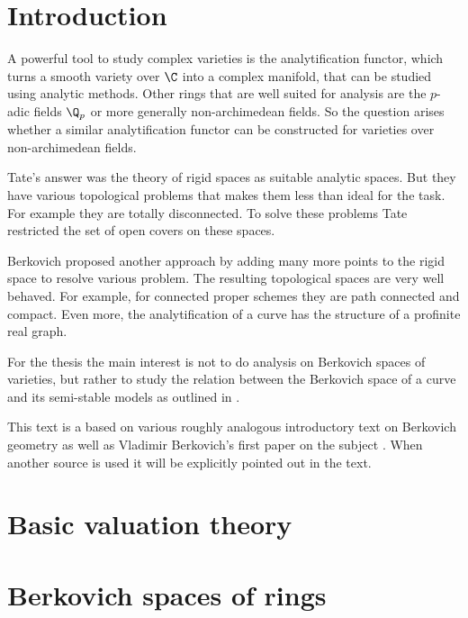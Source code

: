 \section{Introduction} \label{sec:introduction}

A powerful tool to study complex varieties is the analytification functor, which turns a  smooth variety over $\C$ into a complex manifold, that can be studied using analytic methods. 
Other rings that are well suited for analysis are the $p$-adic fields $\Q_p$ or more generally non-archimedean fields. 
So the question arises whether a similar analytification functor can be constructed for  varieties over non-archimedean fields. 

Tate's answer was the theory of rigid spaces as suitable analytic spaces. 
But they have various topological problems that makes them less than ideal for the task. 
For example they are totally disconnected. To solve these problems Tate restricted the set of open covers on these spaces. 

Berkovich proposed another approach by adding many more points to the rigid space to resolve various problem. 
The resulting topological spaces are very well behaved. 
For example, for connected proper schemes they are path connected and compact. 
Even more, the analytification of a curve has the structure of a profinite real graph. 

For the thesis the main interest is not to do analysis on Berkovich spaces of varieties, but rather to study the relation between the Berkovich space of a curve and its semi-stable models as outlined in \cite{bakerStructureNonarchimedeanAnalytic2013}.

This text is a based on various roughly analogous introductory text on Berkovich geometry \cite{bakerarizona,temkinIntroductionBerkovichAnalytic2010,nicaiseNonarchimedeanGeometry2017,boschLecturesFormalRigid2014, wojciechwawrowBerkovicSpaces2020} as well as Vladimir Berkovich's first paper on the subject \cite{berkovichSpectralTheoryAnalytic2012}.
When another source is used it will be explicitly pointed out in the text. 

\section{Basic valuation theory} \label{sec:basic_valuation_theory}



\section{Berkovich spaces of rings} \label{sec:berkovich_spaces}




